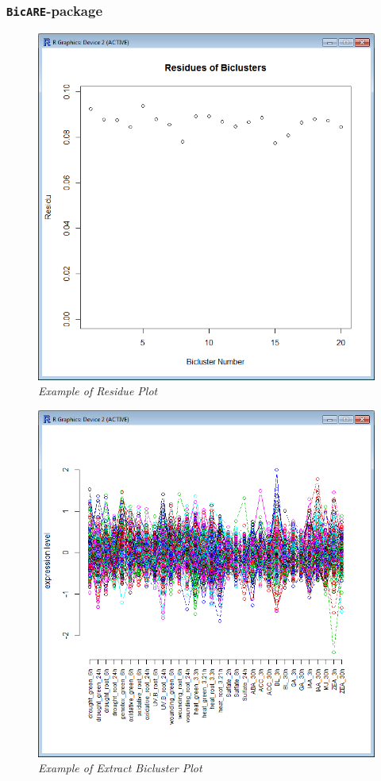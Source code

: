 \documentclass[a4paper]{article}\usepackage[]{graphicx}\usepackage[]{color}
\begin{document}
\subsubsection{\texttt{BicARE}-package}
\begin{figure}[H]
\centering
\includegraphics[scale=0.4]{figures/bicare_example1.png}
\caption{{\it Example of Residue Plot}\label{bicare_example1}}
\end{figure}
\begin{figure}[H]
\centering
\includegraphics[scale=0.4]{figures/bicare_example2.png}
\caption{{\it Example of Extract Bicluster Plot}\label{bicare_example2}}
\end{figure}
\end{document}
